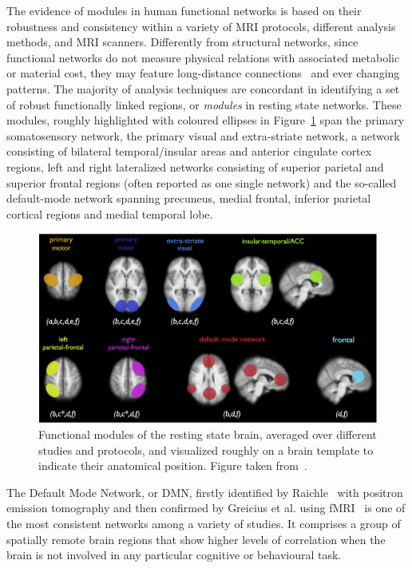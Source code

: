 The evidence of modules in human functional networks is based on their robustness and consistency within a variety of MRI protocols, different analysis methods, and MRI scanners. 
Differently from structural networks, since functional networks do not measure physical relations with associated metabolic or material cost, they may feature long-distance connections~\cite{dehaene1998,varela2001} and ever changing patterns.
The majority of analysis techniques are concordant in identifying a set of robust functionally linked regions, or \emph{modules} in resting state networks.
These modules, roughly highlighted with coloured ellipses in Figure~\ref{fig:vandenheuvelnetworks} span the primary somatosensory network, the primary visual and extra-striate network, a network consisting of bilateral temporal/insular areas and anterior cingulate cortex regions, left and right lateralized networks consisting of superior parietal and superior frontal regions (often reported as one single network) and the so-called default-mode network spanning precuneus, medial frontal, inferior parietal cortical regions and medial temporal lobe.
\begin{figure}[!htb]
\centering
\includegraphics[width=1.0\textwidth]{images/vandenheuvel_networks.pdf}
\caption{Functional modules of the resting state brain, averaged over different studies and protocols, and visualized roughly on a brain template to indicate their anatomical position. Figure taken from~\cite{vandenheuvel2010}.}
\label{fig:vandenheuvelnetworks}
\end{figure}
The Default Mode Network, or DMN, firstly identified by Raichle~\cite{raichle2001} with positron emission tomography and then confirmed by Greicius et al. using fMRI~\cite{greicius2003} is one of the most consistent networks among a variety of studies. It comprises a group of spatially remote brain regions that show higher levels of correlation when the brain is not involved in any particular cognitive or behavioural task.
